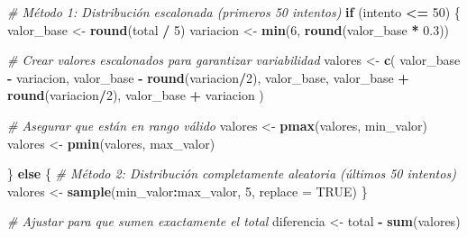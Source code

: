 \documentclass[
]{article}
\newenvironment{Shaded}{\begin{snugshade}}{\end{snugshade}}
\newcommand{\AttributeTok}[1]{\textcolor[rgb]{0.13,0.29,0.53}{#1}}
\newcommand{\CommentTok}[1]{\textcolor[rgb]{0.56,0.35,0.01}{\textit{#1}}}
\newcommand{\ConstantTok}[1]{\textcolor[rgb]{0.56,0.35,0.01}{#1}}
\newcommand{\ControlFlowTok}[1]{\textcolor[rgb]{0.13,0.29,0.53}{\textbf{#1}}}
\newcommand{\DecValTok}[1]{\textcolor[rgb]{0.00,0.00,0.81}{#1}}
\newcommand{\FloatTok}[1]{\textcolor[rgb]{0.00,0.00,0.81}{#1}}
\newcommand{\FunctionTok}[1]{\textcolor[rgb]{0.13,0.29,0.53}{\textbf{#1}}}
\newcommand{\NormalTok}[1]{#1}
\newcommand{\OtherTok}[1]{\textcolor[rgb]{0.56,0.35,0.01}{#1}}
\newcommand{\SpecialCharTok}[1]{\textcolor[rgb]{0.81,0.36,0.00}{\textbf{#1}}}
\begin{document}
\begin{Shaded}
\begin{Highlighting}[]
    \CommentTok{\# Método 1: Distribución escalonada (primeros 50 intentos)}
    \ControlFlowTok{if}\NormalTok{ (intento }\SpecialCharTok{\textless{}=} \DecValTok{50}\NormalTok{) \{}
\NormalTok{      valor\_base }\OtherTok{\textless{}{-}} \FunctionTok{round}\NormalTok{(total }\SpecialCharTok{/} \DecValTok{5}\NormalTok{)}
\NormalTok{      variacion }\OtherTok{\textless{}{-}} \FunctionTok{min}\NormalTok{(}\DecValTok{6}\NormalTok{, }\FunctionTok{round}\NormalTok{(valor\_base }\SpecialCharTok{*} \FloatTok{0.3}\NormalTok{))}

      \CommentTok{\# Crear valores escalonados para garantizar variabilidad}
\NormalTok{      valores }\OtherTok{\textless{}{-}} \FunctionTok{c}\NormalTok{(}
\NormalTok{        valor\_base }\SpecialCharTok{{-}}\NormalTok{ variacion,}
\NormalTok{        valor\_base }\SpecialCharTok{{-}} \FunctionTok{round}\NormalTok{(variacion}\SpecialCharTok{/}\DecValTok{2}\NormalTok{),}
\NormalTok{        valor\_base,}
\NormalTok{        valor\_base }\SpecialCharTok{+} \FunctionTok{round}\NormalTok{(variacion}\SpecialCharTok{/}\DecValTok{2}\NormalTok{),}
\NormalTok{        valor\_base }\SpecialCharTok{+}\NormalTok{ variacion}
\NormalTok{      )}

      \CommentTok{\# Asegurar que están en rango válido}
\NormalTok{      valores }\OtherTok{\textless{}{-}} \FunctionTok{pmax}\NormalTok{(valores, min\_valor)}
\NormalTok{      valores }\OtherTok{\textless{}{-}} \FunctionTok{pmin}\NormalTok{(valores, max\_valor)}

\NormalTok{    \} }\ControlFlowTok{else}\NormalTok{ \{}
      \CommentTok{\# Método 2: Distribución completamente aleatoria (últimos 50 intentos)}
\NormalTok{      valores }\OtherTok{\textless{}{-}} \FunctionTok{sample}\NormalTok{(min\_valor}\SpecialCharTok{:}\NormalTok{max\_valor, }\DecValTok{5}\NormalTok{, }\AttributeTok{replace =} \ConstantTok{TRUE}\NormalTok{)}
\NormalTok{    \}}

    \CommentTok{\# Ajustar para que sumen exactamente el total}
\NormalTok{    diferencia }\OtherTok{\textless{}{-}}\NormalTok{ total }\SpecialCharTok{{-}} \FunctionTok{sum}\NormalTok{(valores)}


\end{Highlighting}
\end{Shaded}
\end{document}

